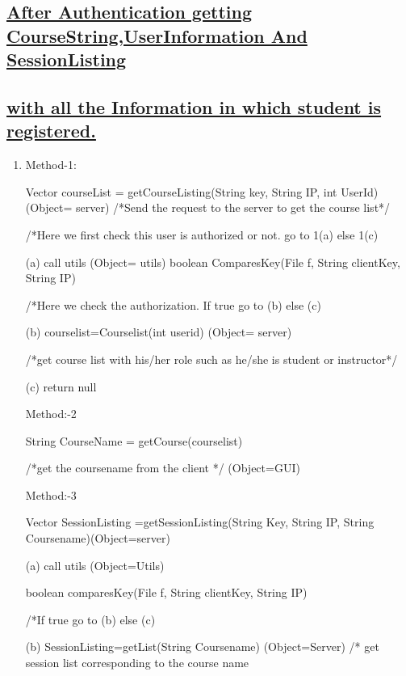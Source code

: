 \documentclass{article}
\begin{document}
\begin{enumerate}
\subsection*{\underline{After Authentication getting CourseString,UserInformation  And SessionListing}} 
\subsection*{\underline{with all the Information in which student is registered.}}   
\begin{enumerate}
\item[{}{}]


Method-1: 
 
 Vector courseList = getCourseListing(String key, String IP, int UserId) (Object= server) 
	/*Send the request to the server to get the course list*/ 

	/*Here we first check this user is authorized or not.  go to 1(a)  else 1(c) 
 
(a)   call utils                                                                                                       (Object= utils) 
boolean ComparesKey(File f, String clientKey, String IP)    

	/*Here we check the authorization. If true go to (b) else (c) 

(b)   courselist=Courselist(int userid)                                                           (Object= server) 

      /*get course list with his/her role such as he/she is student or instructor*/ 
 
(c)      return null 
 
Method:-2 
 
String CourseName = getCourse(courselist) 

   /*get the coursename from the client */   (Object=GUI) 
 
Method:-3 
 
 Vector SessionListing =getSessionListing(String Key, String IP, String Coursename)(Object=server) 
 
(a)  call utils                                          (Object=Utils) 

boolean comparesKey(File f, String clientKey, String IP) 

/*If true go to (b) else (c)		 

(b) SessionListing=getList(String Coursename)   (Object=Server)
               /* get session list corresponding to the course name 
 

\end{enumerate}
\end{enumerate}
\end{document}
